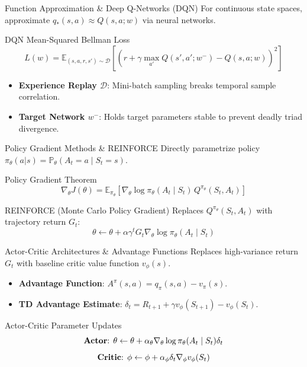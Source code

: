 \documentclass[10pt, aspectratio=169]{beamer}
\begin{document}
\begin{frame}{Function Approximation \& Deep Q-Networks (DQN)}
  For continuous state spaces, approximate $q_*(s, a) \approx Q(s, a; w)$ via neural networks.

  \begin{block}{DQN Mean-Squared Bellman Loss}
    $$L(w) = \mathbb{E}_{(s, a, r, s') \sim \mathcal{D}} \left[ \left( r + \gamma \max_{a'} Q(s', a'; w^-) - Q(s, a; w) \right)^2 \right]$$
  \end{block}

  \begin{itemize}
    \item \textbf{Experience Replay $\mathcal{D}$}: Mini-batch sampling breaks temporal sample correlation.
    \item \textbf{Target Network $w^-$}: Holds target parameters stable to prevent deadly triad divergence.
  \end{itemize}
\end{frame}

\begin{frame}{Policy Gradient Methods \& REINFORCE}
  Directly parametrize policy $\pi_\theta(a|s) = \mathbb{P}_\theta(A_t=a \mid S_t=s)$.

  \begin{block}{Policy Gradient Theorem}
    $$\nabla_\theta J(\theta) = \mathbb{E}_{\pi_\theta} \left[ \nabla_\theta \log \pi_\theta(A_t \mid S_t) \, Q^{\pi_\theta}(S_t, A_t) \right]$$
  \end{block}

  \begin{block}{REINFORCE (Monte Carlo Policy Gradient)}
    Replaces $Q^{\pi_\theta}(S_t, A_t)$ with trajectory return $G_t$:
    $$\theta \leftarrow \theta + \alpha \gamma^t G_t \nabla_\theta \log \pi_\theta(A_t \mid S_t)$$
  \end{block}
\end{frame}

\begin{frame}{Actor-Critic Architectures \& Advantage Functions}
  Replaces high-variance return $G_t$ with baseline critic value function $v_\phi(s)$.

  \begin{itemize}
    \item \textbf{Advantage Function}: $A^\pi(s, a) = q_\pi(s, a) - v_\pi(s)$.
    \item \textbf{TD Advantage Estimate}: $\delta_t = R_{t+1} + \gamma v_\phi(S_{t+1}) - v_\phi(S_t)$.
  \end{itemize}

  \begin{block}{Actor-Critic Parameter Updates}
    $$\text{\textbf{Actor}: } \theta \leftarrow \theta + \alpha_\theta \nabla_\theta \log \pi_\theta(A_t \mid S_t) \delta_t$$
    $$\text{\textbf{Critic}: } \phi \leftarrow \phi + \alpha_\phi \delta_t \nabla_\phi v_\phi(S_t)$$
  \end{block}
\end{frame}
\end{document}
